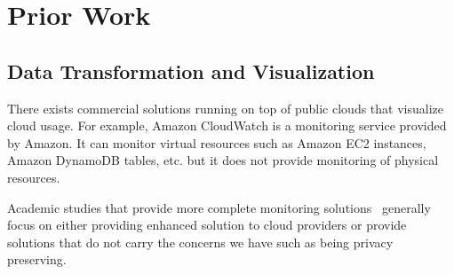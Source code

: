 

\section{Prior Work}
\label{sec:PriorWork}



\subsection{Data Transformation and Visualization}

There exists commercial solutions running on top of public clouds that visualize cloud usage. For example, Amazon CloudWatch is a monitoring service provided by Amazon. It can monitor virtual resources such as Amazon EC2 instances, Amazon DynamoDB tables, etc. but it does not provide monitoring of physical resources. 

Academic studies that provide more complete monitoring solutions~\cite{chaves2011toward, montes2013gmone, povedano2013dargos, alcaraz2015monpaas} generally focus on either providing enhanced solution to cloud providers or provide solutions that do not carry the concerns we have such as being privacy preserving.